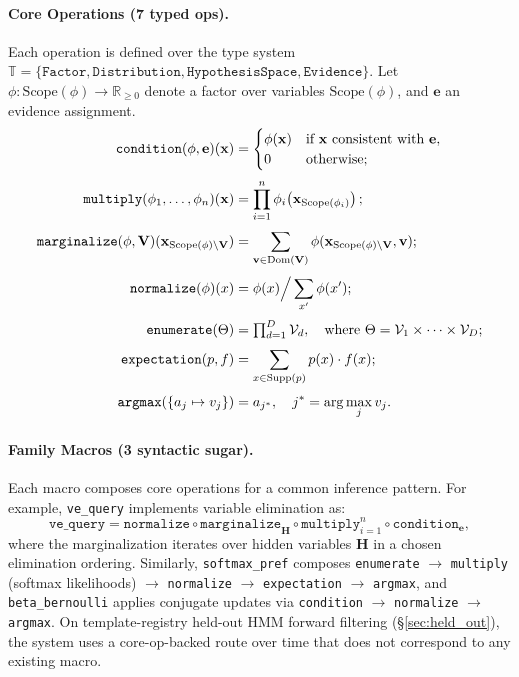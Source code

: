 \documentclass{article}
\providecommand{\bigtimes}{\mathop{\mathchoice{\textstyle\prod}{\prod}{\prod}{\prod}}\nolimits}  %
\begin{document}
\paragraph{Core Operations (7 typed ops).}
Each operation is defined over the type system $\mathbb{T} = \{\texttt{Factor}, \texttt{Distribution}, \texttt{HypothesisSpace}, \texttt{Evidence}\}$.
Let $\phi: \text{Scope}(\phi) \to \mathbb{R}_{\geq 0}$ denote a factor over variables $\text{Scope}(\phi)$, and $\mathbf{e}$ an evidence assignment.
\begin{align}
\texttt{condition}(\phi, \mathbf{e})(\mathbf{x}) &= \begin{cases} \phi(\mathbf{x}) & \text{if } \mathbf{x} \text{ consistent with } \mathbf{e}, \\ 0 & \text{otherwise}; \end{cases} \label{eq:op_condition} \\[3pt]
\texttt{multiply}(\phi_1, \ldots, \phi_n)(\mathbf{x}) &= \prod_{i=1}^{n} \phi_i\!\left(\mathbf{x}_{\text{Scope}(\phi_i)}\right); \label{eq:op_multiply} \\[3pt]
\texttt{marginalize}(\phi, \mathbf{V})(\mathbf{x}_{\text{Scope}(\phi) \setminus \mathbf{V}}) &= \sum_{\mathbf{v} \in \text{Dom}(\mathbf{V})} \phi(\mathbf{x}_{\text{Scope}(\phi) \setminus \mathbf{V}}, \mathbf{v}); \label{eq:op_marginalize} \\[3pt]
\texttt{normalize}(\phi)(x) &= \phi(x) \Big/ \sum_{x'} \phi(x'); \label{eq:op_normalize} \\[3pt]
\texttt{enumerate}(\Theta) &= \bigtimes_{d=1}^{D} \mathcal{V}_d, \quad \text{where } \Theta = \mathcal{V}_1 \times \cdots \times \mathcal{V}_D; \label{eq:op_enum} \\[3pt]
\texttt{expectation}(p, f) &= \sum_{x \in \text{Supp}(p)} p(x) \cdot f(x); \label{eq:op_expect} \\[3pt]
\texttt{argmax}(\{a_j \mapsto v_j\}) &= a_{j^*}, \quad j^* = \arg\max_j v_j. \label{eq:op_argmax}
\end{align}

\paragraph{Family Macros (3 syntactic sugar).}
Each macro composes core operations for a common inference pattern.
For example, \texttt{ve\_query} implements variable elimination as:
\begin{equation}
\texttt{ve\_query} = \texttt{normalize} \circ \texttt{marginalize}_{\mathbf{H}} \circ \texttt{multiply}_{i=1}^{n} \circ \texttt{condition}_{\mathbf{e}},
\label{eq:macro_ve}
\end{equation}
where the marginalization iterates over hidden variables $\mathbf{H}$ in a chosen elimination ordering.
Similarly, \texttt{softmax\_pref} composes \texttt{enumerate} $\to$ \texttt{multiply} (softmax likelihoods) $\to$ \texttt{normalize} $\to$ \texttt{expectation} $\to$ \texttt{argmax}, and \texttt{beta\_bernoulli} applies conjugate updates via \texttt{condition} $\to$ \texttt{normalize} $\to$ \texttt{argmax}.
On template-registry held-out HMM forward filtering (\S\ref{sec:held_out}), the system uses a core-op-backed route over time that does not correspond to any existing macro.
\end{document}
